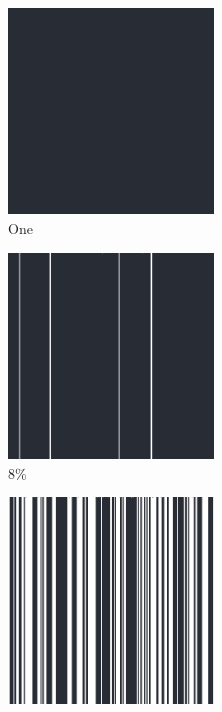 \documentclass[12pt, fleqn]{report}                             %
\theoremstyle{break}                                            %
\begin{document}
      \begin{figure}[ht!]
        \centering
        \begin{subfigure}[b]{0.4\linewidth}
          \includegraphics[width=0.6\textwidth]{Images/232/a.png}
          \caption{One}
        \end{subfigure}
        \begin{subfigure}[b]{0.4\linewidth}
          \includegraphics[width=0.6\textwidth]{Images/232/b.png}
          \caption{8\%}
        \end{subfigure}
        \begin{subfigure}[b]{0.4\linewidth}
          \includegraphics[width=0.6\textwidth]{Images/232/c.png}

\end{subfigure}
\end{figure}
\end{document}
